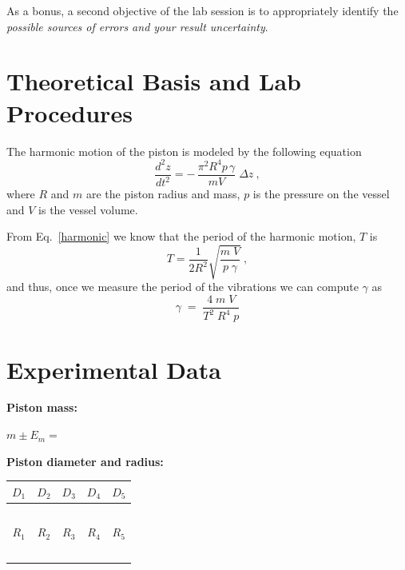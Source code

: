 \documentclass{article}
\begin{document}
As a bonus, a second objective of the lab session is to appropriately identify the
\textit{possible sources of errors and your result uncertainty}. 


\section{Theoretical Basis and Lab Procedures}
The harmonic motion of the piston is modeled by the following equation
\begin{equation}
\frac{d^2 z}{d t^2} =  - \, \frac{\pi^2 R^4 p \, \gamma}{m  V} \;
\Delta z~,
\label{harmonic}
\end{equation}
\noindent where $R$ and $m$ are the piston radius and mass, $p$ is the
pressure on the vessel and $V$ is the vessel volume.

From Eq.~\eqref{harmonic} we know that the period of the harmonic
motion, $T$ is
\begin{equation}
T = \frac{1}{2 R^2} \sqrt{\frac{m \; V}{p \; \gamma}}~,
\end{equation}
\noindent and thus, once we measure the period of the vibrations we
can compute $\gamma$ as
{\large
\begin{equation}
\gamma \; = \; \frac{4 \; m \; V}{T^2 \; R^4 \; p}
\end{equation}
}


\section{Experimental Data}


\textbf{Piston mass:}

\vspace{5mm}

$m\pm E_m = $ \underline{\hspace{4cm}}

\vspace{5mm}


\textbf{Piston diameter and radius:}

\vspace{5mm}

\begin{tabular}{|c|c|c|c|c|}
\hline
$D_1$&$D_2$&$D_3$&$D_4$&$D_5$\\
\hline
~\hspace{3cm}~&~\hspace{3cm}~&~\hspace{3cm}~&\hspace{3cm}~&~\hspace{3cm}~\\
\hline
$R_1$&$R_2$&$R_3$&$R_4$&$R_5$\\
\hline
\hspace{3cm}~&~\hspace{3cm}~&~\hspace{3cm}~&~\hspace{3cm}~&~\hspace{3cm}~\\
\hline
\end{tabular}
\end{document}
